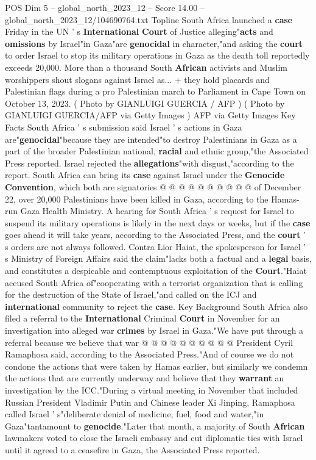 \begin{textsample}{POS Dim 5 – global\_north\_2023\_12 – Score 14.00 – global\_north\_2023\_12/104690764.txt}  \label{ex:f5_pos_345}
Topline South Africa launched a \textbf{case} Friday in the UN ' s \textbf{International} \textbf{Court} of Justice alleging"\textbf{acts} and \textbf{omissions} by Israel"in Gaza"are \textbf{genocidal} in character,"and asking the \textbf{court} to order Israel to stop its military operations in Gaza as the death toll reportedly exceeds 20,000.
More than a thousand South \textbf{African} activists and Muslim worshippers shout slogans against Israel as... + they hold placards and Palestinian flags during a pro Palestinian march to Parliament in Cape Town on October 13, 2023. ( Photo by GIANLUIGI GUERCIA / AFP ) ( Photo by GIANLUIGI GUERCIA/AFP via Getty Images ) AFP via Getty Images Key Facts South Africa ' s submission said Israel ' s actions in Gaza are"\textbf{genocidal}"because they are intended"to destroy Palestinians in Gaza as a part of the broader Palestinian national, \textbf{racial} and ethnic group,"the Associated Press reported.
Israel rejected the \textbf{allegations}"with disgust,"according to the report.
South Africa can bring its \textbf{case} against Israel under the \textbf{Genocide} \textbf{Convention}, which both are signatories @ @ @ @ @ @ @ @ @ @ of December 22, over 20,000 Palestinians have been killed in Gaza, according to the Hamas-run Gaza Health Ministry.
A hearing for South Africa ' s request for Israel to suspend its military operations is likely in the next days or weeks, but if the \textbf{case} goes ahead it will take years, according to the Associated Press, and the \textbf{court} ' s orders are not always followed.
Contra Lior Haiat, the spokesperson for Israel ' s Ministry of Foreign Affairs said the claim"lacks both a factual and a \textbf{legal} basis, and constitutes a despicable and contemptuous exploitation of the \textbf{Court}."Haiat accused South Africa of"cooperating with a terrorist organization that is calling for the destruction of the State of Israel,"and called on the ICJ and \textbf{international} community to reject the \textbf{case}.
Key Background South Africa also filed a referral to the \textbf{International} Criminal \textbf{Court} in November for an investigation into alleged war \textbf{crimes} by Israel in Gaza."We have put through a referral because we believe that war @ @ @ @ @ @ @ @ @ @ President Cyril Ramaphosa said, according to the Associated Press."And of course we do not condone the actions that were taken by Hamas earlier, but similarly we condemn the actions that are currently underway and believe that they \textbf{warrant} an investigation by the ICC."During a virtual meeting in November that included Russian President Vladimir Putin and Chinese leader Xi Jinping, Ramaphosa called Israel ' s"deliberate denial of medicine, fuel, food and water,"in Gaza"tantamount to \textbf{genocide}."Later that month, a majority of South \textbf{African} lawmakers voted to close the Israeli embassy and cut diplomatic ties with Israel until it agreed to a ceasefire in Gaza, the Associated Press reported.

\end{textsample}
